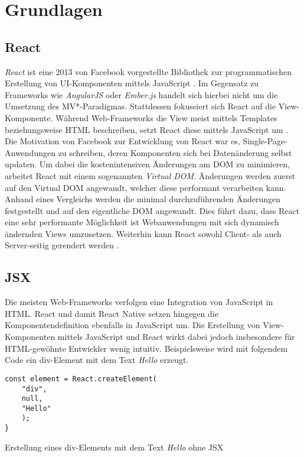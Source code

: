 \section{Grundlagen}

\subsection{React}
\textit{React} ist eine 2013 von Facebook vorgestellte Bibliothek zur programmatischen Erstellung von UI-Komponenten mittels JavaScript \cite{facebook_inc._react_2016}. Im Gegensatz zu Frameworks wie \textit{AngularJS} oder \textit{Ember.js} handelt sich hierbei nicht um die Umsetzung des MV*-Paradigmas. Stattdessen fokussiert sich React auf die View-Komponente. Während Web-Frameworks die View meist mittels Templates beziehungsweise HTML beschreiben, setzt React diese mittels JavaScript um \cite{hunt_why_2013}. Die Motivation von Facebook zur Entwicklung von React war es, Single-Page-Anwendungen zu schreiben, deren Komponenten sich bei Datenänderung selbst updaten. Um dabei die kostenintensiven Änderungen am DOM zu minimieren, arbeitet React mit einem sogenannten \textit{Virtual DOM}. Änderungen werden zuerst auf den Virtual DOM angewandt, welcher diese performant verarbeiten kann. Anhand eines Vergleichs werden die minimal durchzuführenden Änderungen festgestellt und auf den eigentliche DOM angewandt. Dies führt dazu, dass React eine sehr performante Möglichkeit ist Webanwendungen mit sich dynamisch ändernden Views umzusetzen. Weiterhin kann React sowohl Client- als auch Server-seitig gerendert werden \cite{hunt_why_2013}.
 
\subsection{JSX}
Die meisten Web-Frameworks verfolgen eine Integration von JavaScript in HTML. React und damit React Native setzen hingegen die Komponentendefinition ebenfalls in JavaScript um.
Die Erstellung von View-Komponenten mittels JavaScript und React wirkt dabei jedoch insbesondere für HTML-gewöhnte Entwickler wenig intuitiv. Beispielsweise wird mit folgendem Code ein div-Element mit dem Text \textit{Hello} erzeugt.
\begin{listing}[H]
    \begin{verbatim}
const element = React.createElement(
    "div",
    null,
    "Hello"
    );
}
    \end{verbatim}
    \caption{Erstellung eines div-Elements mit dem Text \textit{Hello} ohne JSX}
    \label{lst:jsx_without_jsx}
\end{listing}

